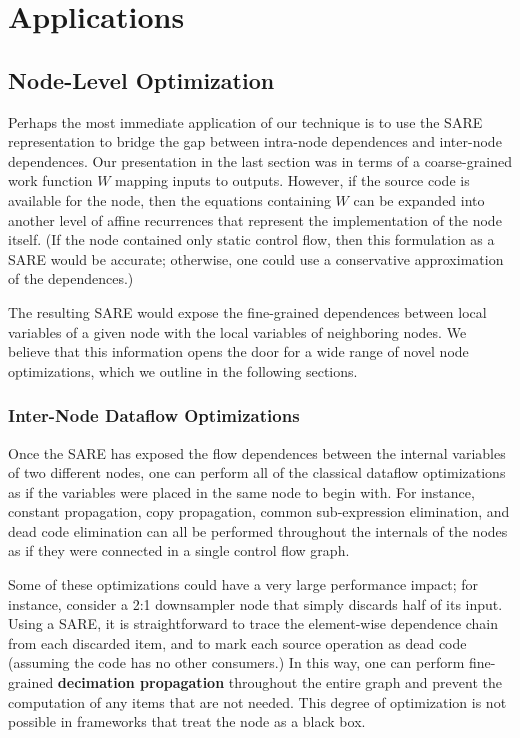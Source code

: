 \section{Applications}

\subsection{Node-Level Optimization}

Perhaps the most immediate application of our technique is to use the
SARE representation to bridge the gap between intra-node dependences
and inter-node dependences.  Our presentation in the last section was
in terms of a coarse-grained work function $W$ mapping inputs to
outputs.  However, if the source code is available for the node, then
the equations containing $W$ can be expanded into another level of
affine recurrences that represent the implementation of the node
itself.  (If the node contained only static control flow, then this
formulation as a SARE would be accurate; otherwise, one could use a
conservative approximation of the dependences.)

The resulting SARE would expose the fine-grained dependences between
local variables of a given node with the local variables of
neighboring nodes.  We believe that this information opens the door
for a wide range of novel node optimizations, which we outline in the
following sections.

\subsubsection{Inter-Node Dataflow Optimizations}

Once the SARE has exposed the flow dependences between the internal
variables of two different nodes, one can perform all of the classical
dataflow optimizations as if the variables were placed in the same
node to begin with.  For instance, constant propagation, copy
propagation, common sub-expression elimination, and dead code
elimination can all be performed throughout the internals of the nodes
as if they were connected in a single control flow graph.

Some of these optimizations could have a very large performance
impact; for instance, consider a 2:1 downsampler node that simply
discards half of its input.  Using a SARE, it is straightforward to
trace the element-wise dependence chain from each discarded item, and
to mark each source operation as dead code (assuming the code has no
other consumers.)  In this way, one can perform fine-grained {\bf
decimation propagation} throughout the entire graph and prevent the
computation of any items that are not needed.  This degree of
optimization is not possible in frameworks that treat the node as a
black box.

